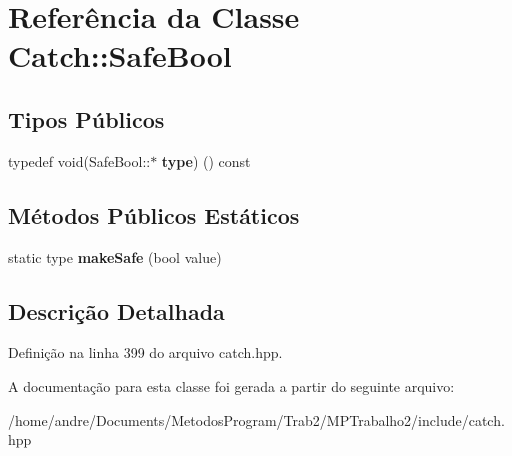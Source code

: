 \hypertarget{classCatch_1_1SafeBool}{}\section{Referência da Classe Catch\+:\+:Safe\+Bool}
\label{classCatch_1_1SafeBool}
\subsection*{Tipos Públicos}
\begin{DoxyCompactItemize}
\item 
typedef void(Safe\+Bool\+::$\ast$ {\bfseries type}) () const \hypertarget{classCatch_1_1SafeBool_a852cdacb020a98edeee0f4da4cf790d5}{}\label{classCatch_1_1SafeBool_a852cdacb020a98edeee0f4da4cf790d5}

\end{DoxyCompactItemize}
\subsection*{Métodos Públicos Estáticos}
\begin{DoxyCompactItemize}
\item 
static type {\bfseries make\+Safe} (bool value)\hypertarget{classCatch_1_1SafeBool_af0ea63d9820f8bf7a8b76377913c4e77}{}\label{classCatch_1_1SafeBool_af0ea63d9820f8bf7a8b76377913c4e77}

\end{DoxyCompactItemize}


\subsection{Descrição Detalhada}


Definição na linha 399 do arquivo catch.\+hpp.



A documentação para esta classe foi gerada a partir do seguinte arquivo\+:\begin{DoxyCompactItemize}
\item 
/home/andre/\+Documents/\+Metodos\+Program/\+Trab2/\+M\+P\+Trabalho2/include/catch.\+hpp\end{DoxyCompactItemize}
